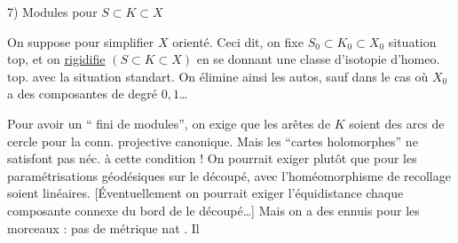 7) Modules pour $S\subset K\subset X$

On suppose  pour simplifier $X$   orienté.
Ceci dit, on fixe $S_0\subset K_0\subset X_0$ situation
top, et on \uline{rigidifie} $(S\subset K\subset X)$ en
se donnant une classe d'isotopie d'homeo.
top. avec la situation standart. On élimine
ainsi les autos, sauf dans le cas
 où $X_0$ a des composantes de degré
$0,1$\ldots

Pour avoir un `` fini de modules'',
on  exige que les arêtes de $K$ soient
des arcs de cercle pour la conn.
projective canonique. Mais les
``cartes  holomorphes'' ne satisfont pas
néc. à cette condition ! On pourrait
exiger plutôt que pour  les
paramétrisations géodésiques sur le
découpé,  avec l'homéomorphisme
de recollage soient linéaires. [Éventuellement
on pourrait exiger l'équidistance  
chaque composante connexe du bord de
le découpé\ldots] Mais on a des ennuis
pour les morceaux  
: pas de métrique nat . Il

